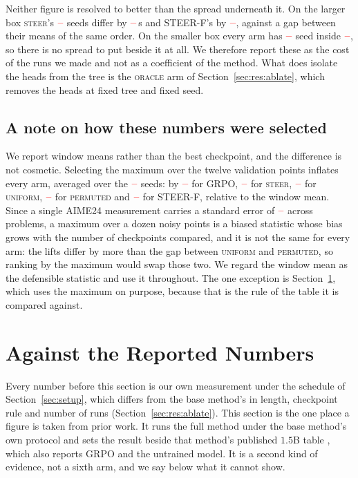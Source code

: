 \documentclass[11pt]{article}
\providecommand{\PENDING}{\textcolor{red}{\textbf{--}}}
\newcommand{\num}[1]{\ifcsname #1\endcsname\csname #1\endcsname\else\PENDING\fi}
\begin{document}
Neither figure is resolved to better than the spread underneath it. On the larger box
\textsc{steer}'s $\num{Costnsteerhi}$ seeds differ by $\num{Costrsteerhi}$\,s and
STEER-F's by $\num{Costrsignedhi}$, against a gap between their means of the same
order. On the smaller box every arm has $\num{Costnsteerlo}$ seed inside
$\num{Seedset}$, so there is no spread to put beside it at all. We therefore
report these as the cost of the runs we made and not as a coefficient of the method.
What does isolate the heads from the tree is the \textsc{oracle} arm of
Section~\ref{sec:res:ablate}, which removes the heads at fixed tree and fixed seed.

\subsection{A note on how these numbers were selected}
\label{sec:res:selection}

We report window means rather than the best checkpoint, and the difference is not
cosmetic. Selecting the maximum over the twelve validation points inflates every arm,
averaged over the $\num{Nseedsused}$ seeds: by $\num{Rgrposellift}$ for GRPO,
$\num{Rsteersellift}$ for \textsc{steer}, $\num{Runiformsellift}$ for
\textsc{uniform}, $\num{Rpermutedsellift}$ for \textsc{permuted} and
$\num{Rsignedsellift}$ for STEER-F, relative to the window mean.
Since a single AIME24 measurement carries a standard error of $\num{SEaime}$ across
problems, a maximum over a dozen noisy points is a biased statistic whose bias grows
with the number of checkpoints compared, and it is not the same for every arm: the
lifts differ by more than the gap between \textsc{uniform} and \textsc{permuted},
so ranking by the maximum would swap those two. We regard the window mean as the
defensible statistic and use it throughout. The one exception is
Section~\ref{sec:reported}, which uses the maximum on purpose, because that is the
rule of the table it is compared against.

\section{Against the Reported Numbers}
\label{sec:reported}

Every number before this section is our own measurement under the schedule of
Section~\ref{sec:setup}, which differs from the base method's in length, checkpoint
rule and number of runs (Section~\ref{sec:res:ablate}). This section is the one place
a figure is taken from prior work. It runs the full method under the base method's own
protocol and sets the result beside that method's published $1.5$B table
\citep[Table~12]{steer}, which also reports GRPO and the untrained model. It is a
second kind of evidence, not a sixth arm, and we say below what it cannot show.
\end{document}
